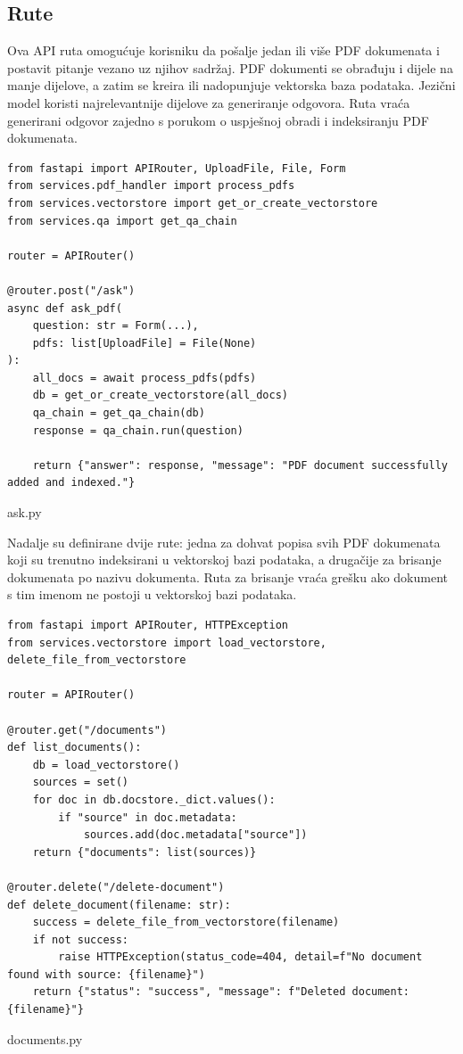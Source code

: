 \documentclass[]{foi}
\begin{document}
\subsection{Rute}
Ova API ruta omogućuje korisniku da pošalje jedan ili više PDF dokumenata i postavit pitanje vezano uz njihov sadržaj. PDF dokumenti
se obrađuju i dijele na manje dijelove, a zatim se kreira ili nadopunjuje vektorska baza podataka. Jezični model koristi najrelevantnije dijelove
za generiranje odgovora. Ruta vraća generirani odgovor zajedno s porukom o uspješnoj obradi i indeksiranju PDF dokumenata.

\begin{longlisting}
\begin{verbatim}
from fastapi import APIRouter, UploadFile, File, Form
from services.pdf_handler import process_pdfs
from services.vectorstore import get_or_create_vectorstore
from services.qa import get_qa_chain

router = APIRouter()

@router.post("/ask")
async def ask_pdf(
    question: str = Form(...),
    pdfs: list[UploadFile] = File(None)
):
    all_docs = await process_pdfs(pdfs)
    db = get_or_create_vectorstore(all_docs)
    qa_chain = get_qa_chain(db)
    response = qa_chain.run(question)

    return {"answer": response, "message": "PDF document successfully added and indexed."}
\end{verbatim}
\caption{ask.py}
\label{lst:ask}
\end{longlisting}

Nadalje su definirane dvije rute: jedna za dohvat popisa svih PDF dokumenata koji su trenutno indeksirani u vektorskoj bazi podataka, a drugačije
za brisanje dokumenata po nazivu dokumenta. Ruta za brisanje vraća grešku ako dokument s tim imenom ne postoji u vektorskoj bazi podataka.

\begin{longlisting}
\begin{verbatim}
from fastapi import APIRouter, HTTPException
from services.vectorstore import load_vectorstore, delete_file_from_vectorstore

router = APIRouter()

@router.get("/documents")
def list_documents():
    db = load_vectorstore()
    sources = set()
    for doc in db.docstore._dict.values():
        if "source" in doc.metadata:
            sources.add(doc.metadata["source"])
    return {"documents": list(sources)}

@router.delete("/delete-document")
def delete_document(filename: str):
    success = delete_file_from_vectorstore(filename)
    if not success:
        raise HTTPException(status_code=404, detail=f"No document found with source: {filename}")
    return {"status": "success", "message": f"Deleted document: {filename}"}
\end{verbatim}
\caption{documents.py}
\label{lst:documents}
\end{longlisting}
\end{document}
